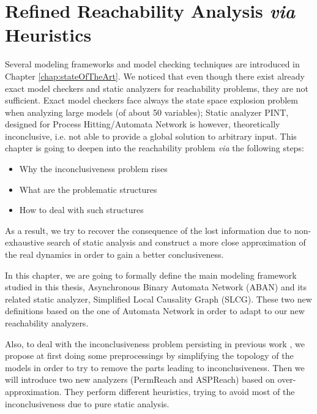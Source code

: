 \chapter{Refined Reachability Analysis \textit{via} Heuristics}\label{chap:refinement}
\begin{mybox}
Several modeling frameworks and model checking techniques are introduced in Chapter \ref{chap:stateOfTheArt}.
We noticed that even though there exist already exact model checkers and static analyzers for reachability problems, they are not sufficient.
Exact model checkers face always the state space explosion problem when analyzing large models (of about 50 variables);
Static analyzer PINT, designed for Process Hitting/Automata Network is however, theoretically inconclusive, i.e. not able to provide a global solution to arbitrary input.
This chapter is going to deepen into the reachability problem \textit{via} the following steps:

\begin{itemize}
    \item Why the inconclusiveness problem rises
    \item What are the problematic structures
    \item How to deal with such structures
\end{itemize}

As a result, we try to recover the consequence of the lost information due to non-exhaustive search of static analysis and construct a more close approximation of the real dynamics in order to gain a better conclusiveness.
\end{mybox}

In this chapter, we are going to formally define the main modeling framework studied in this thesis, Asynchronous Binary Automata Network (ABAN) and its related static analyzer, Simplified Local Causality Graph (SLCG).
These two new definitions based on the one of Automata Network in order to adapt to our new reachability analyzers.

Also, to deal with the inconclusiveness problem persisting in previous work \cite{folschette2015}, we propose at first doing some preprocessings by simplifying the topology of the models in order to try to remove the parts leading to inconclusiveness.
Then we will introduce two new analyzers (PermReach and ASPReach) based on over-approximation.
They perform different heuristics, trying to avoid most of the inconclusiveness due to pure static analysis.

